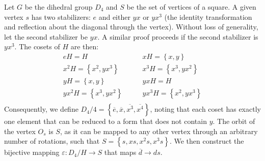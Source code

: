 \documentclass{article}
\begin{document}
\clearpage

Let $G$ be the dihedral group $D_4$ and $S$ be the set of vertices of a square. A given vertex $s$ has two stabilizers: $e$ and either $yx$ or $yx^3$ (the identity transformation and reflection about the diagonal through the vertex). Without loss of generality, let the second stabilizer be $yx$. A similar proof proceeds if the second stabilizer is $yx^3$. The cosets of $H$ are then:
\begin{equation}
    \begin{split}
        eH = H \quad & \quad xH = \left\{x, y\right\} \\
        x^2H = \left\{x^2, yx^3\right\} \quad & \quad x^3H = \left\{x^3, yx^2\right\} \\
        yH = \left\{x, y\right\} \quad & \quad yxH = H \\
        yx^2H = \left\{x^3, yx^2\right\} \quad & \quad yx^3H = \left\{x^2, yx^3\right\} \\
    \end{split}
\end{equation}
Consequently, we define $D_4 / 4 = \left\{\overline{e}, \overline{x}, \overline{x^3}, \overline{x^4}\right\}$, noting that each coset has exactly one element that can be reduced to a form that does not contain $y$. The orbit of the vertex $O_s$ is $S$, as it can be mapped to any other vertex through an arbitrary number of rotations,  such that $S = \left\{s, xs, x^2s, x^3s\right\}$. We then construct the bijective mapping $\varepsilon : D_4 / H \to S$ that maps $\overline{d} \to ds$.

\clearpage
\end{document}
